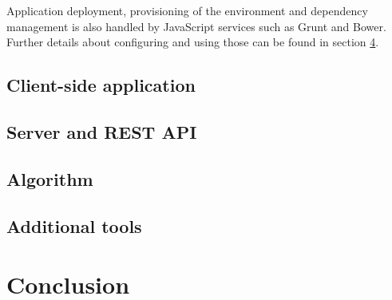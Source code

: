 \documentclass[bsc,frontabs,twoside,singlespacing,parskip]{infthesis}     %
\begin{document}
	Application deployment, provisioning of the environment and dependency management is also handled by JavaScript services such as Grunt and Bower. Further details about configuring and using those can be found in section \ref{tools}.
	
	\section{Client-side application}
	
	
	
	\section{Server and REST API}
	
	
	
	\section{Algorithm}\label{algo}
	
	
	
	\section{Additional tools}\label{tools}
	
	

\chapter{Conclusion}





\end{document}
